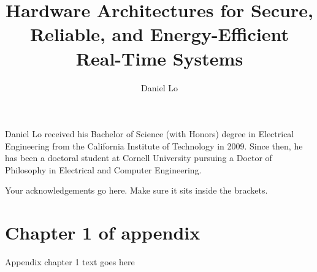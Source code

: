\documentclass[phd,tocprelim]{cornell}
\title {Hardware Architectures for Secure, Reliable, and Energy-Efficient Real-Time Systems}
\author {Daniel Lo}
\begin{document}
\maketitle
\makecopyright

\begin{abstract}

\end{abstract}

\begin{biosketch}
Daniel Lo received his Bachelor of Science (with Honors) degree in Electrical
Engineering from the California Institute of Technology in 2009. Since then, he
has been a doctoral student at Cornell University pursuing a Doctor of
Philosophy in Electrical and Computer Engineering.
\end{biosketch}


\begin{acknowledgements}
Your acknowledgements go here. Make sure it sits inside the brackets.
\end{acknowledgements}

\contentspage
\tablelistpage
\figurelistpage

\normalspacing \setcounter{page}{1} 
\pagestyle{cornell} \addtolength{\parskip}{0.5\baselineskip}










\appendix
\chapter{Chapter 1 of appendix}
Appendix chapter 1 text goes here


\end{document}
